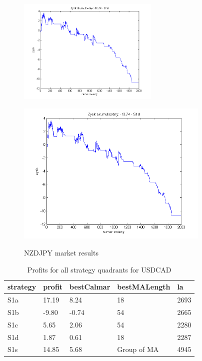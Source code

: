 \documentclass{tewiart}
\begin{document}
\begin{figure}[h]
\begin{minipage}{\linewidth}
\centering
\includegraphics[width=0.6\textwidth]{images/nzdjpyS1d.png}
\label{mansard}
\end{minipage}
\begin{minipage}{.49\linewidth}
\centering
\includegraphics[width=0.82\textwidth]{images/nzdjpyS1s.png}
\label{mansard}
\end{minipage}
\caption{NZDJPY market results}
\end{figure}
\newpage
\begin{table}[!t]
\caption{Profits for all strategy quadrants for USDCAD}
 \begin{center}
 \begin{tabular}{|l|l|l|l|l|}
 \hline \textbf{strategy} & \textbf{profit} & \textbf{bestCalmar} & \textbf{bestMALength} & \textbf{la} \\ \hline
S1a & 17.19 & 8.24 & 18 & 2693\\ \hline
S1b & -9.80 & -0.74 & 54 & 2665\\ \hline
S1c & 5.65 & 2.06 & 54 & 2280\\ \hline
S1d & 1.87 & 0.61 & 18 & 2287\\ \hline
S1s & 14.85 & 5.68 & Group of MA & 4945\\
\hline \end{tabular}
 \end{center}
 \end{table}
\end{document}
